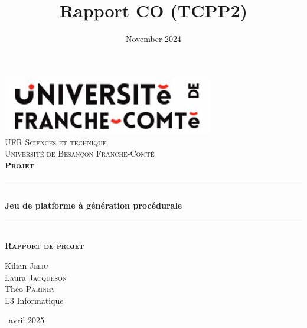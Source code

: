 \documentclass[10pt]{report}
\title{Rapport CO (TCPP2)}
\date{November 2024}
\newcommand{\HRule}{\rule{\linewidth}{0.5mm}}
\renewcommand\thesection{\arabic{section}}
\begin{document}
\begin{titlepage}
  \begin{center}
    \includegraphics[height=25mm]{gfx/OIP.jpg}~\\[4cm]

    \textsc{\LARGE UFR Sciences et technique}\\
    \textsc{\Large Université de Besançon Franche-Comté }\\
    \textsc{\Large \textbf{Projet}}\\[1.5cm]

    \HRule \\[0.4cm]
    { \huge \bfseries Jeu de platforme à génération procédurale\\[0.4cm] }

    \HRule \\[0.6cm]\renewcommand\thesection{\arabic{section}}
    \textsc{\Large \textbf{Rapport de projet}}\\[1.5cm]
    \begin{minipage}{\textwidth}
      \begin{center}\LARGE
        Kilian \textsc{Jelic} \\
        Laura \textsc{Jacqueson} \\
        Théo \textsc{Pariney} \\
        L3 Informatique
      \end{center}
    \end{minipage}
    \vfill
    {\large \ avril 2025}

  \end{center}
\end{titlepage}

\normalsize
{}
\tableofcontents
\pagebreak
\listoffigures
\pagebreak
\end{document}
